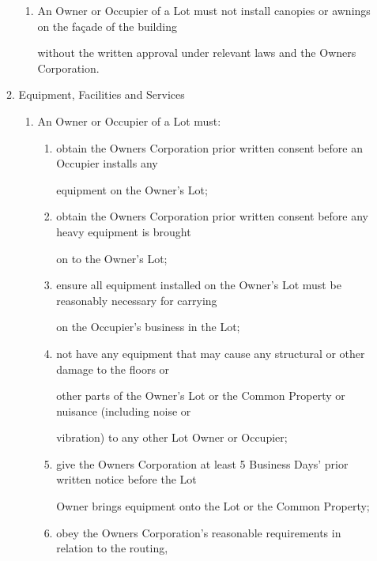 \documentclass{article}
\begin{document}
\begin{enumerate}[label=\arabic*.]
\begin{enumerate}[label=\arabic{enumi}.\arabic*.]
\begin{enumerate}[label=(\arabic*)]
\item {\fontsize{9.962}{1} An Owner or Occupier of a Lot must not install canopies or awnings on the façade of the building }

{\fontsize{10.02}{1}without the written approval under relevant laws and the Owners Corporation. }

\end{enumerate}
\item {\fontsize{9.99}{1} Equipment, Facilities and Services }

\begin{enumerate}[label=(\arabic*)]
\item {\fontsize{9.962}{1} An Owner or Occupier of a Lot must: }

\begin{enumerate}[label=(\alph*)]
\item {\fontsize{9.962}{1} obtain the Owners Corporation prior written consent before an Occupier installs any }

{\fontsize{10.02}{1}equipment on the Owner’s Lot; }

\item {\fontsize{9.962}{1} obtain the Owners Corporation prior written consent before any heavy equipment is brought }

{\fontsize{10.02}{1}on to the Owner’s Lot; }

\item {\fontsize{9.962}{1} ensure all equipment installed on the Owner’s Lot must be reasonably necessary for carrying }

{\fontsize{10.02}{1}on the Occupier’s business in the Lot; }

\item {\fontsize{9.962}{1} not have any equipment that may cause any structural or other damage to the floors or }

{\fontsize{10.02}{1}other parts of the Owner’s Lot or the Common Property or nuisance (including noise or }

{\fontsize{10.02}{1}vibration) to any other Lot Owner or Occupier; }

\item {\fontsize{9.962}{1} give the Owners Corporation at least 5 Business Days’ prior written notice before the Lot }

{\fontsize{10.02}{1}Owner brings equipment onto the Lot or the Common Property; }

\item {\fontsize{9.962}{1} obey the Owners Corporation’s reasonable requirements in relation to the routing, }


\end{enumerate}
\end{enumerate}
\end{enumerate}
\end{enumerate}
\end{document}
